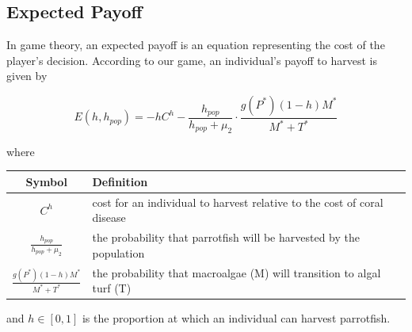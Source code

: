 \documentclass[12pt]{article}
\begin{document}
\subsection{Expected Payoff}
In game theory, an expected payoff is an equation representing the cost of the player's decision. According to our game, an individual's payoff to harvest is given by



\begin{equation}
    \displaystyle {E(h, h_{pop}) = -hC^{h} - \frac{h_{pop}}{h_{pop} + \mu_{2}} \cdot \frac{g(P^{*})(1-h)M^{*}}{M^{*} + T^{*}}}
    \label{eq:payoff}
\end{equation} 

where

\begin{table}[H]
    \centering
    \begin{tabular}{c|p{9cm}}
         Symbol & Definition \\
         \hline
         $C^{h}$ & cost for an individual to harvest relative to the cost of coral disease \\
         $\frac{h_{pop}}{h_{pop} + \mu_{2}}$ & the probability that parrotfish will be harvested by the population \\
         $\frac{g(P^{*})(1-h)M^{*}}{M^{*} + T^{*}}$ & the probability that macroalgae (M) will transition to algal turf (T)
    \end{tabular}
    \label{tab:payoff_eq_params}
\end{table}

and $h \in [0,1]$ is the proportion at which an individual can harvest parrotfish. \\


\end{document}
